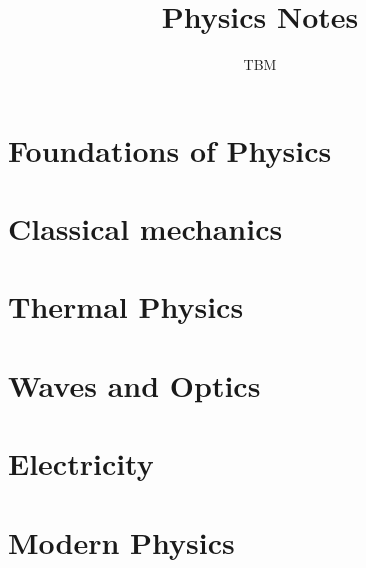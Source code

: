 \documentclass[12pt]{report}
\title{Physics Notes}
\author{TBM}
\theoremstyle{definition}
\begin{document}
    \maketitle
    
    \tableofcontents
    
    \chapter{Foundations of Physics}
    
    \clearpage
    
    \chapter{Classical mechanics}
    \label{chapter:mechanics}
    
    \clearpage
    
    \chapter{Thermal Physics}
    
    \clearpage
    
    \chapter{Waves and Optics}
    
    \clearpage
    
    \chapter{Electricity}
    
    \clearpage
    
    
    \chapter{Modern Physics}
    
    \clearpage
    
\end{document}
